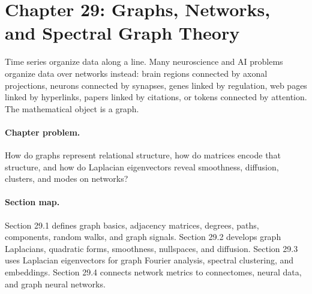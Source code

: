 \section{Chapter 29: Graphs, Networks, and Spectral Graph Theory}
\label{ch:graphs-networks-spectral-graph-theory}

Time series organize data along a line. Many neuroscience and AI problems organize data over networks instead: brain regions connected by axonal projections, neurons connected by synapses, genes linked by regulation, web pages linked by hyperlinks, papers linked by citations, or tokens connected by attention. The mathematical object is a graph.

\paragraph{Chapter problem.}
How do graphs represent relational structure, how do matrices encode that structure, and how do Laplacian eigenvectors reveal smoothness, diffusion, clusters, and modes on networks?

\paragraph{Section map.}
Section 29.1 defines graph basics, adjacency matrices, degrees, paths, components, random walks, and graph signals. Section 29.2 develops graph Laplacians, quadratic forms, smoothness, nullspaces, and diffusion. Section 29.3 uses Laplacian eigenvectors for graph Fourier analysis, spectral clustering, and embeddings. Section 29.4 connects network metrics to connectomes, neural data, and graph neural networks.

